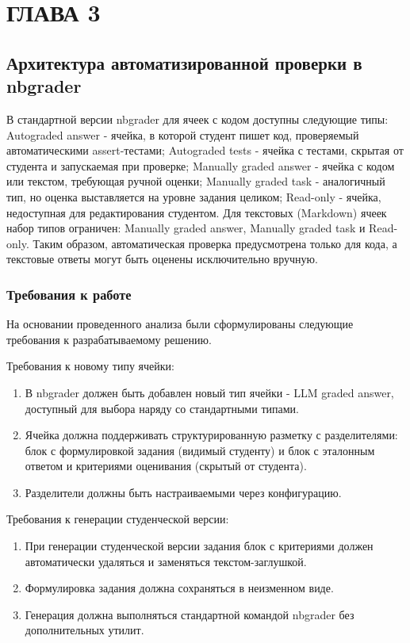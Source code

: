 \chapter*{ГЛАВА 3}
\sloppy


\section{Архитектура автоматизированной проверки в nbgrader}

В стандартной версии nbgrader для ячеек с кодом доступны следующие типы: Autograded answer - ячейка, в которой студент пишет код, проверяемый автоматическими assert-тестами; Autograded tests - ячейка с тестами, скрытая от студента и запускаемая при проверке; Manually graded answer - ячейка с кодом или текстом, требующая ручной оценки; Manually graded task - аналогичный тип, но оценка выставляется на уровне задания целиком; Read-only - ячейка, недоступная для редактирования студентом. Для текстовых (Markdown) ячеек набор типов ограничен: Manually graded answer, Manually graded task и Read-only. Таким образом, автоматическая проверка предусмотрена только для кода, а текстовые ответы могут быть оценены исключительно вручную.

\subsection{Требования к работе}

На основании проведенного анализа были сформулированы следующие требования к разрабатываемому решению.

Требования к новому типу ячейки:

\begin{enumerate}
    \item В nbgrader должен быть добавлен новый тип ячейки - LLM graded answer, доступный для выбора наряду со стандартными типами.
    \item Ячейка должна поддерживать структурированную разметку с разделителями: блок с формулировкой задания (видимый студенту) и блок с эталонным ответом и критериями оценивания (скрытый от студента).
    \item Разделители должны быть настраиваемыми через конфигурацию.
\end{enumerate}

Требования к генерации студенческой версии:

\begin{enumerate}
    \item При генерации студенческой версии задания блок с критериями должен автоматически удаляться и заменяться текстом-заглушкой.
    \item Формулировка задания должна сохраняться в неизменном виде.
    \item Генерация должна выполняться стандартной командой nbgrader без дополнительных утилит.
\end{enumerate}

